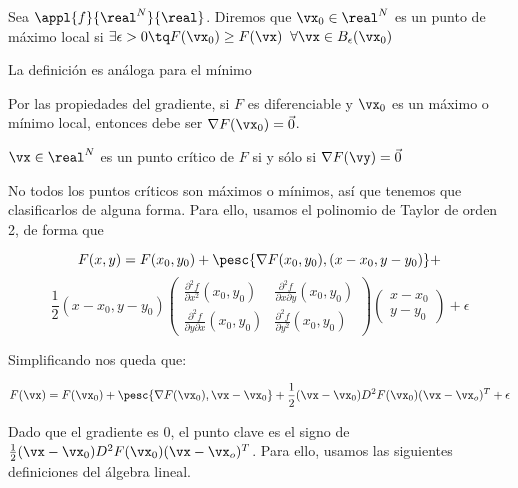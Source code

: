 \documentclass[12pt,a4paper,titlepage]{apuntes}
\begin{document}
\begin{defn} Sea $\appl{f}{\real^N}{\real}$. Diremos que $\vx_0 \in \real^N$ es un punto de máximo local si $\exists \epsilon > 0 \tq F(\vx_0) \geq F(\vx)\;\; \forall \vx \in B_{\epsilon} (\vx_0) $

La definición es análoga para el mínimo\end{defn}

\begin{remark} Por las propiedades del gradiente, si $F$ es diferenciable y $\vx_0$ es un máximo o mínimo local, entonces debe ser $\nabla F(\vx_0) = \vec{0}$.\end{remark}

\begin{defn} $\vx \in \real^N$ es un punto crítico de $F$ si y sólo si $\nabla F(\vy) = \vec{0}$\end{defn}

No todos los puntos críticos son máximos o mínimos, así que tenemos que clasificarlos de alguna forma. Para ello, usamos el polinomio de Taylor de orden 2, de forma que 

\[F(x,y) = F(x_0, y_0) + \pesc{\nabla F(x_0, y_0), (x-x_0, y-y_0)} +\]\[\frac{1}{2}(x-x_0, y-y_0)\left(\begin{matrix} \frac{\partial^2 f}{∂ x^2} (x_0,y_0) & \frac{\partial^2 f}{\partial x \partial y} (x_0,y_0) 
\\ \frac{\partial^2 f}{\partial y \partial x} (x_0,y_0) & \frac{\partial^2 f}{\partial y^2} (x_0,y_0) \end{matrix}\right) \left(\begin{matrix} x - x_0 \\ y - y_0 \end{matrix}\right) + \epsilon \]

Simplificando nos queda que:

\[F(\vx) = F(\vx_0) + \pesc{\nabla F(\vx_0),\vx - \vx_0} + \frac{1}{2}(\vx - \vx_0) D^2F(\vx_0) (\vx - \vx_o) ^T + \epsilon\]

Dado que el gradiente es 0, el punto clave es el signo de $\frac{1}{2}(\vx - \vx_0) D^2F(\vx_0) (\vx - \vx_o) ^T$. Para ello, usamos las siguientes definiciones del álgebra lineal.
\end{document}
